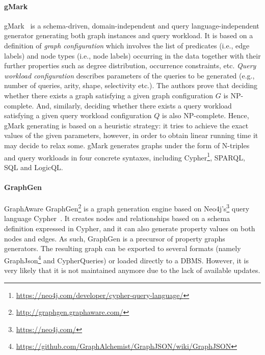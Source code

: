 \paragraph{gMark}  gMark~\cite{gMark} is a schema-driven, domain-independent and query language-independent generator generating both graph instances and query workload.  It is based on a  definition of \emph{graph configuration} which involves the list of predicates (i.e., edge labels) and node types (i.e., node labels) occurring in the data together with their further properties such as degree distribution, occurrence constraints, etc. \emph{Query workload configuration}  describes parameters of the queries to be generated (e.g., number of queries, arity, shape, selectivity etc.). The authors prove that deciding whether there exists a graph satisfying a given graph configuration $G$ is NP-complete. And, similarly, deciding
whether there exists a query workload satisfying a given query workload configuration $Q$ is also NP-complete. Hence, gMark generating is based on a heuristic strategy: it tries to achieve the exact values of the given parameters, however, in order to obtain linear running time it may decide to relax some. gMark generates graphs under the form of N-triples and query workloads in four concrete syntaxes, including Cypher\footnote{\url{https://neo4j.com/developer/cypher-query-language/}}, SPARQL, SQL and LogicQL.

\paragraph{GraphGen}  GraphAware GraphGen\footnote{\url{http://graphgen.graphaware.com/}} is a graph generation engine based on Neo4j's\footnote{\url{https://neo4j.com/}} query language Cypher~\cite{GraphGen}.  It creates nodes and relationships based on a schema definition expressed in Cypher, and it can also generate property values on both
nodes and edges. As such, GraphGen is a precursor of property graphs generators. The resulting graph can be exported to several formats (namely GraphJson\footnote{\url{https://github.com/GraphAlchemist/GraphJSON/wiki/GraphJSON}} and CypherQueries) or loaded directly to a DBMS. However, it is very likely that it is not maintained anymore due to the lack of available updates. 
